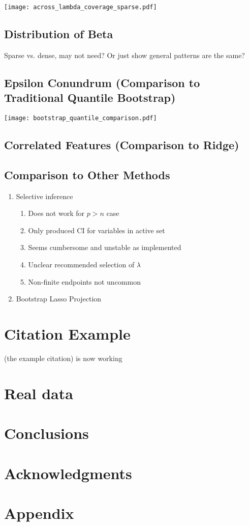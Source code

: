 \texttt{[image: across\_lambda\_coverage\_sparse.pdf]}

\subsection{Distribution of Beta}

Sparse vs. dense, may not need? Or just show general patterns are the same?

\subsection{Epsilon Conundrum (Comparison to Traditional Quantile Bootstrap)}
\texttt{[image: bootstrap\_quantile\_comparison.pdf]}

\subsection{Correlated Features (Comparison to Ridge)}


\subsection{Comparison to Other Methods}

\begin{enumerate}
\item Selective inference
\begin{enumerate}
\item Does not work for $p > n$ case
\item Only produced CI for variables in active set
\item Seems cumbersome and unstable as implemented
\item Unclear recommended selection of $\lambda$
\item Non-finite endpoints not uncommon
\end{enumerate}
\item{Bootstrap Lasso Projection}
\end{enumerate}

\section{Citation Example}
\cite{Tibshirani1996} (the example citation) is now working


\section{Real data}

\section{Conclusions}

\section*{Acknowledgments}

\section*{Appendix}
